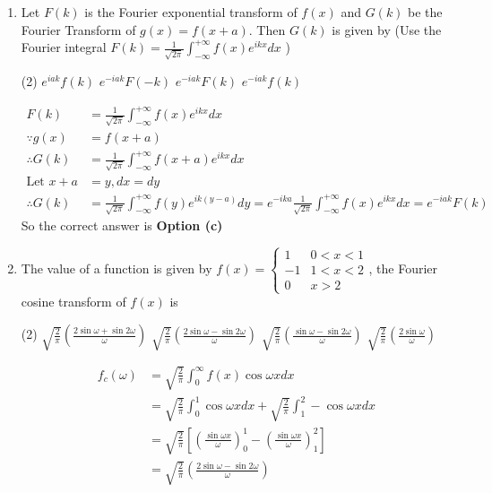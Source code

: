 \begin{enumerate}


	\item Let $F(k)$ is the Fourier exponential transform of $f(x)$ and $G(k)$ be the Fourier Transform of $g(x)=f(x+a)$. Then $G(k)$ is given by
(Use the Fourier integral $F(k)=\frac{1}{\sqrt{2 \pi}} \int_{-\infty}^{+\infty} f(x) e^{i k x} d x$ )
\begin{tasks}(2)
	\task[\textbf{a.}]$e^{i a k} f(k)$
	\task[\textbf{b.}]$e^{-i a k} F(-k)$
	\task[\textbf{c.}] $e^{-i a k} F(k)$
	\task[\textbf{d.}] $e^{-i a k} f(k)$
\end{tasks}
\begin{answer}
	\begin{align*}
	F(k)&=\frac{1}{\sqrt{2 \pi}} \int_{-\infty}^{+\infty} f(x) e^{i k x} d x\\
	\because g(x)&=f(x+a)\\
	\therefore G(k)&=\frac{1}{\sqrt{2 \pi}} \int_{-\infty}^{+\infty} f(x+a) e^{i k x} d x\\
	\text{Let }x+a&=y, d x=d y\\
	\therefore G(k)&=\frac{1}{\sqrt{2 \pi}} \int_{-\infty}^{+\infty} f(y) e^{i k(y-a)} d y=e^{-i k a} \frac{1}{\sqrt{2 \pi}} \int_{-\infty}^{+\infty} f(x) e^{i k x} d x=e^{-i a k} F(k)
	\end{align*}
	So the correct answer is \textbf{Option (c)}
\end{answer}
\item The value of a function is given by $f(x)=\left\{\begin{array}{cc}1 & 0<x<1 \\ -1 & 1<x<2 \\ 0 & x>2\end{array}\right.$, the Fourier cosine transform of $f(x)$ is
\begin{tasks}(2)
	\task[\textbf{a.}]$\sqrt{\frac{2}{\pi}}\left(\frac{2 \sin \omega+\sin 2 \omega}{\omega}\right)$
	\task[\textbf{b.}]$\sqrt{\frac{2}{\pi}}\left(\frac{2 \sin \omega-\sin 2 \omega}{\omega}\right)$
	\task[\textbf{c.}]$\sqrt{\frac{2}{\pi}}\left(\frac{\sin \omega-\sin 2 \omega}{\omega}\right)$
	\task[\textbf{d.}] $\sqrt{\frac{2}{\pi}}\left(\frac{2 \sin \omega}{\omega}\right)$
\end{tasks}
\begin{answer}
	\begin{align*}
	f_{c}(\omega) &=\sqrt{\frac{2}{\pi}} \int_{0}^{\infty} f(x) \cos \omega x d x \\ &=\sqrt{\frac{2}{\pi}} \int_{0}^{1} \cos \omega x d x+\sqrt{\frac{2}{\pi}} \int_{1}^{2}-\cos \omega x d x \\ &=\sqrt{\frac{2}{\pi}}\left[\left(\frac{\sin \omega x}{\omega}\right)_{0}^{1}-\left(\frac{\sin \omega x}{\omega}\right)_{1}^{2}\right] \\ &=\sqrt{\frac{2}{\pi}}\left(\frac{2 \sin \omega-\sin 2 \omega}{\omega}\right) 

\end{align*}
\end{answer}
\end{enumerate}
